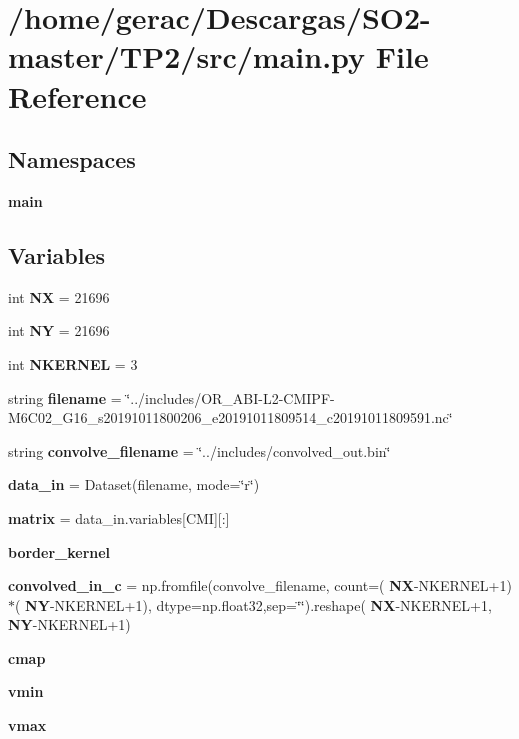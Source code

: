 \section{/home/gerac/\+Descargas/\+S\+O2-\/master/\+T\+P2/src/main.py File Reference}
\label{main_8py}
\subsection*{Namespaces}
\begin{DoxyCompactItemize}
\item 
 \textbf{ main}
\end{DoxyCompactItemize}
\subsection*{Variables}
\begin{DoxyCompactItemize}
\item 
int \textbf{ NX} = 21696
\item 
int \textbf{ NY} = 21696
\item 
int \textbf{ N\+K\+E\+R\+N\+EL} = 3
\item 
string \textbf{ filename} = \char`\"{}../includes/O\+R\+\_\+\+A\+BI-\/L2-\/C\+M\+I\+PF-\/M6\+C02\+\_\+\+G16\+\_\+s20191011800206\+\_\+e20191011809514\+\_\+c20191011809591.\+nc\char`\"{}
\item 
string \textbf{ convolve\+\_\+filename} = \char`\"{}../includes/convolved\+\_\+out.\+bin\char`\"{}
\item 
\textbf{ data\+\_\+in} = Dataset(filename, mode=\char`\"{}r\char`\"{})
\item 
\textbf{ matrix} = data\+\_\+in.\+variables[\textquotesingle{}C\+MI\textquotesingle{}][\+:]
\item 
\textbf{ border\+\_\+kernel}
\item 
\textbf{ convolved\+\_\+in\+\_\+c} = np.\+fromfile(convolve\+\_\+filename, count=(\textbf{ NX}-\/N\+K\+E\+R\+N\+EL+1)$\ast$(\textbf{ NY}-\/N\+K\+E\+R\+N\+EL+1), dtype=np.\+float32,sep=\char`\"{}\char`\"{}).reshape(\textbf{ NX}-\/N\+K\+E\+R\+N\+EL+1,\textbf{ NY}-\/N\+K\+E\+R\+N\+EL+1)
\item 
\textbf{ cmap}
\item 
\textbf{ vmin}
\item 
\textbf{ vmax}
\end{DoxyCompactItemize}

